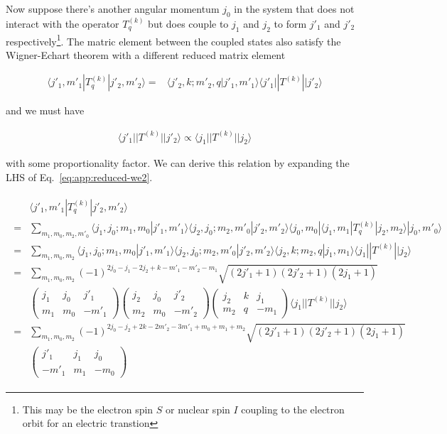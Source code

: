 \documentclass[10pt,fleqn]{article}
\newcommand{\eqar}[1]
{
  \begin{align}
    #1
  \end{align}
}
\newcommand{\paren}[1]{{\left({#1}\right)}}
\begin{document}
Now suppose there's another angular momentum $j_0$ in the system
that does not interact with the operator $T_q^{(k)}$
but does couple to $j_1$ and $j_2$
to form $j'_1$ and $j'_2$ respectively\footnote{
  This may be the electron spin $S$ or nuclear spin $I$
  coupling to the electron orbit for an electric transtion}.
The matric element between the coupled states also satisfy the Wigner-Echart theorem
with a different reduced matrix element
\eqar{
  \langle j'_1,m'_1|T_q^{(k)}|j'_2,m'_2 \rangle=&\langle j'_2,k;m'_2,q|j'_1,m'_1\rangle\langle j'_1||T^{(k)}||j'_2\rangle\label{eq:app:reduced-we2}
}
and we must have
\eqar{
  \langle j'_1||T^{(k)}||j'_2\rangle\propto\langle j_1||T^{(k)}||j_2\rangle
}
with some proportionality factor.
We can derive this relation by expanding the LHS of Eq.~\ref{eq:app:reduced-we2}.
\eqar{
  \begin{split}
    &\langle j'_1,m'_1|T_q^{(k)}|j'_2,m'_2 \rangle\\
    =&\sum_{m_1,m_0,m_2,m'_0}\langle j_1,j_0;m_1,m_0|j'_1,m'_1\rangle
       \langle j_2,j_0;m_2,m'_0|j'_2,m'_2\rangle
       \langle j_0,m_0|\langle j_1,m_1|T_q^{(k)}|j_2,m_2\rangle|j_0,m'_0\rangle\\
    =&\sum_{m_1,m_0,m_2}\langle j_1,j_0;m_1,m_0|j'_1,m'_1\rangle
       \langle j_2,j_0;m_2,m'_0|j'_2,m'_2\rangle
       \langle j_2,k;m_2,q|j_1,m_1\rangle\langle j_1||T^{(k)}||j_2\rangle\\
    =&\sum_{m_1,m_0,m_2}(-1)^{2j_0-j_1-2j_2+k-m'_1-m'_2-m_1}
       \sqrt{\paren{2j'_1+1}\paren{2j'_2+1}\paren{2j_1+1}}\\
    &\begin{pmatrix}
      j_1&j_0&j'_1\\
      m_1&m_0&-m'_1
    \end{pmatrix}
    \begin{pmatrix}
      j_2&j_0&j'_2\\
      m_2&m_0&-m'_2
    \end{pmatrix}
    \begin{pmatrix}
      j_2&k&j_1\\
      m_2&q&-m_1
    \end{pmatrix}\langle j_1||T^{(k)}||j_2\rangle\\
    =&\sum_{m_1,m_0,m_2}(-1)^{2j_0-j_2+2k-2m'_2-3m'_1 + m_0+m_1+m_2}
       \sqrt{\paren{2j'_1+1}\paren{2j'_2+1}\paren{2j_1+1}}\\
    &\begin{pmatrix}
      j'_1&j_1&j_0\\
      -m'_1&m_1&-m_0
    \end{pmatrix}

\end{split}}
\end{document}
